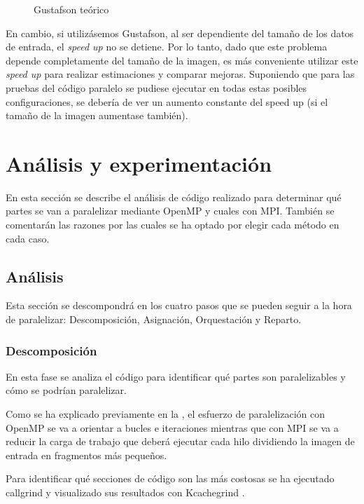 \documentclass[12pt]{report} %
\begin{document}
\begin{figure}[H]
    \makebox[\textwidth][c]{
        
    }
    \caption{Gustafson teórico}
    \label{fig:ley_amdahl}
\end{figure}

En cambio, si utilizásemos Gustafson, al ser dependiente del tamaño de los datos de entrada, el
\textit{speed up} no se detiene. Por lo tanto, dado que este problema depende completamente del tamaño
de la imagen, es más conveniente utilizar este \textit{speed up} para realizar estimaciones y comparar
mejoras. Suponiendo que para las pruebas del código paralelo se pudiese ejecutar en todas estas posibles
configuraciones, se debería de ver un aumento constante del speed up (si el tamaño de la imagen aumentase
también).


\chapter{Análisis y experimentación}

En esta sección se describe el análisis de código realizado para determinar qué partes se van a
paralelizar mediante OpenMP y cuales con MPI. También se comentarán las razones por las cuales se ha optado
por elegir cada método en cada caso.

\section{Análisis}

Esta sección se descompondrá en los cuatro pasos que se pueden seguir a la hora de paralelizar:
Descomposición, Asignación, Orquestación y Reparto.

\subsection{Descomposición}

En esta fase se analiza el código para identificar qué partes son paralelizables y cómo se podrían paralelizar.

Como se ha explicado previamente en la , el esfuerzo de paralelización con OpenMP se va
a orientar a bucles e iteraciones mientras que con MPI se va a reducir la carga de trabajo que deberá ejecutar
cada hilo dividiendo la imagen de entrada en fragmentos más pequeños.

Para identificar qué secciones de código son las más costosas se ha ejecutado callgrind y visualizado sus
resultados con Kcachegrind \parencite{weidendorfer_kcachegrind_2013}. 
\end{document}
